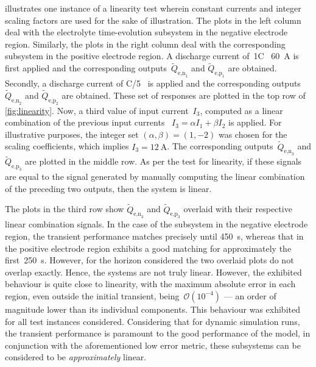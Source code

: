   illustrates  one  instance  of a  linearity  test  wherein
constant  currents  and  integer  scaling  factors are  used  for  the  sake  of
illustration.  The  plots   in  the  left  column  deal   with  the  electrolyte
time-evolution  subsystem  in  the  negative electrode  region.  Similarly,  the
plots  in  the  right  column  deal with  the  corresponding  subsystem  in  the
positive electrode region.  A discharge current of~1C  \ie~\SI{60}{\ampere} is
first  applied  and  the  corresponding  outputs~$\widetilde{Q}_{\text{e,n}_1}$
and   $\widetilde{Q}_{\text{e,p}_1}$  are   obtained.   Secondly,  a   discharge
current   of   C/5   \ie~is    applied   and   the   corresponding   outputs~$\widetilde{Q}_{\text{e,n}_2}$ and  $\widetilde{Q}_{\text{e,p}_2}$ are obtained.
These set of responses are plotted  in the top row of \cref{fig:linearity}. Now,
a  third  value  of  input  current~$I_3$,  computed  as  a  linear  combination
of  the  previous  input  currents  \ie~${I_3 =  \alpha  I_1  +  \beta  I_2  }$
is  applied.  For  illustrative  purposes, the  integer  set  ${(\alpha,\beta)  =
    (1,-2)}$  was  chosen  for  the   scaling  coefficients,  which  implies  ${I_3  =
\SI{12}{\ampere}}$. The corresponding  outputs~$\widetilde{Q}_{\text{e,n}_3}$ and
$\widetilde{Q}_{\text{e,p}_3}$ are  plotted in the  middle row. As per  the test
for linearity,  if these signals are  equal to the signal  generated by manually
computing the linear  combination of the preceding two outputs,  then the system
is linear.

The   plots   in  the   third   row   show  $\widetilde{Q}_{\text{e,n}_3}$   and
$\widetilde{Q}_{\text{e,p}_3}$ overlaid with their respective linear combination
signals. In  the case  of the  subsystem in the  negative electrode  region, the
transient performance matches  precisely until \approx\SI{450}{\second}, whereas
that in the positive electrode region exhibits a good matching for approximately
the  first~\SI{250}{\second}.  However,  for  the  horizon  considered  the  two
overlaid plots do not overlap exactly.  Hence, the systems are not truly linear.
However,  the  exhibited  behaviour  is  quite  close  to  linearity,  with  the
maximum  absolute error  in each  region,  even outside  the initial  transient,
being~$\mathcal{O}(10^{-4})$ --- an order of magnitude lower than its individual
components.  This behaviour  was exhibited  for all  test instances  considered.
Considering  that for  dynamic  simulation runs,  the  transient performance  is
paramount  to  the good  performance  of  the  model,  in conjunction  with  the
aforementioned  low error  metric,  these  subsystems can  be  considered to  be
\emph{approximately} linear.

